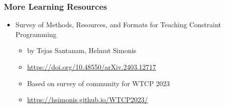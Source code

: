 


\begin{frame}
\frametitle{More Learning Resources}
\begin{itemize}
\item Survey of Methods, Resources, and Formats for Teaching Constraint Programming
\begin{itemize}
\item by Tejas Santanam, Helmut Simonis
\item \url{https://doi.org/10.48550/arXiv.2403.12717}
\item Based on survey of community for WTCP 2023
\item \url{https://hsimonis.github.io/WTCP2023/}
\end{itemize}
\end{itemize}
\end{frame}

